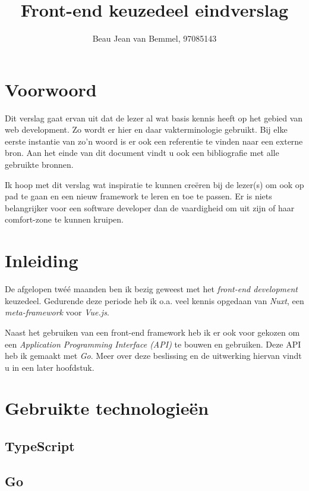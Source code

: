 \documentclass[a4paper]{report}
\title{Front-end keuzedeel eindverslag}
\author{Beau Jean van Bemmel, 97085143}
\begin{document}
    \maketitle

    \chapter*{Voorwoord}
    Dit verslag gaat ervan uit dat de lezer al wat basis kennis heeft op het gebied van web development.
    Zo wordt er hier en daar vakterminologie gebruikt. Bij elke eerste instantie van zo'n woord is er ook een referentie te vinden naar een externe bron.
    Aan het einde van dit document vindt u ook een bibliografie met alle gebruikte bronnen.

    Ik hoop met dit verslag wat inspiratie te kunnen creëren bij de lezer(s) om ook op pad te gaan en een nieuw framework te leren en toe te passen.
    Er is niets belangrijker voor een software developer dan de vaardigheid om uit zijn of haar comfort-zone te kunnen kruipen.
    \tableofcontents

    \chapter{Inleiding}
    De afgelopen twéé maanden ben ik bezig geweest met het \textit{front-end development} keuzedeel.
    Gedurende deze periode heb ik o.a. veel kennis opgedaan van 
    \textit{Nuxt}, een 
    \textit{meta-framework} voor 
    \textit{Vue.js}.
    
    Naast het gebruiken van een front-end framework heb ik er ook voor gekozen om een \textit{Application Programming Interface (API)} te bouwen en gebruiken.
    Deze API heb ik gemaakt met \textit{Go}. Meer over deze beslissing en de uitwerking hiervan vindt u in een later hoofdstuk.

    \chapter{Gebruikte technologieën}
    \section{TypeScript}

    \section{Go}
\end{document}
